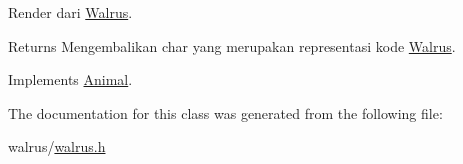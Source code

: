 Render dari \hyperlink{classWalrus}{Walrus}. 

\begin{DoxyReturn}{Returns}
Mengembalikan char yang merupakan representasi kode \hyperlink{classWalrus}{Walrus}. 
\end{DoxyReturn}


Implements \hyperlink{classAnimal_a43a47c0f41d211128e04abc6add53def}{Animal}.



The documentation for this class was generated from the following file\+:\begin{DoxyCompactItemize}
\item 
walrus/\hyperlink{walrus_8h}{walrus.\+h}\end{DoxyCompactItemize}
